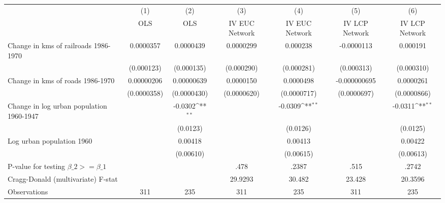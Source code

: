 {
\def\sym#1{\ifmmode^{#1}\else\(^{#1}\)\fi}
\begin{tabular}{l*{6}{c}}
\hline\hline
                &\multicolumn{1}{c}{(1)}&\multicolumn{1}{c}{(2)}&\multicolumn{1}{c}{(3)}&\multicolumn{1}{c}{(4)}&\multicolumn{1}{c}{(5)}&\multicolumn{1}{c}{(6)}\\
                &\multicolumn{1}{c}{OLS}&\multicolumn{1}{c}{OLS}&\multicolumn{1}{c}{IV EUC Network}&\multicolumn{1}{c}{IV EUC Network}&\multicolumn{1}{c}{IV LCP Network}&\multicolumn{1}{c}{IV LCP Network}\\
\hline
Change in kms of railroads 1986-1970&0.0000357         &0.0000439         &0.0000299         & 0.000238         &-0.0000113         & 0.000191         \\
                &(0.000123)         &(0.000135)         &(0.000290)         &(0.000281)         &(0.000313)         &(0.000310)         \\
[1em]
Change in kms of roads 1986-1970&0.00000206         &0.00000639         &0.0000150         &0.0000498         &-0.000000695         &0.0000261         \\
                &(0.0000358)         &(0.0000430)         &(0.0000620)         &(0.0000717)         &(0.0000697)         &(0.0000866)         \\
[1em]
Change in log urban population 1960-1947&                  &  -0.0302\sym{**} &                  &  -0.0309\sym{**} &                  &  -0.0311\sym{**} \\
                &                  & (0.0123)         &                  & (0.0126)         &                  & (0.0125)         \\
[1em]
Log urban population 1960&                  &  0.00418         &                  &  0.00413         &                  &  0.00422         \\
                &                  &(0.00610)         &                  &(0.00615)         &                  &(0.00613)         \\
\hline
P-value for testing $\beta\_{2} >= \beta\_{1}$&                  &                  &     .478         &    .2387         &     .515         &    .2742         \\
Cragg-Donald (multivariate) F-stat&                  &                  &  29.9293         &   30.482         &   23.428         &  20.3596         \\
Observations    &      311         &      235         &      311         &      235         &      311         &      235         \\
\hline\hline
\end{tabular}
}
